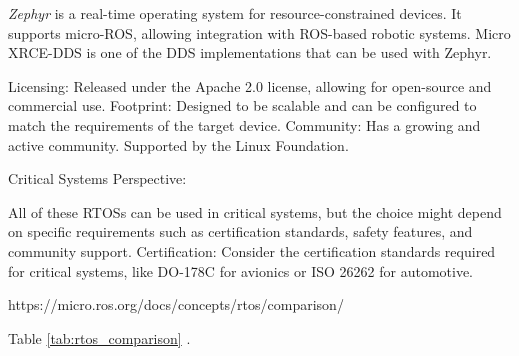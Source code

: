 \textit{Zephyr} is a real-time operating system for resource-constrained devices.
It supports micro-ROS, allowing integration with ROS-based robotic systems.
Micro XRCE-DDS is one of the DDS implementations that can be used with Zephyr.

Licensing: Released under the Apache 2.0 license, allowing for open-source and commercial use.
Footprint: Designed to be scalable and can be configured to match the requirements of the target device.
Community: Has a growing and active community. Supported by the Linux Foundation.

Critical Systems Perspective:

    All of these RTOSs can be used in critical systems, but the choice might depend on specific requirements such as certification standards, safety features, and community support.
    Certification: Consider the certification standards required for critical systems, like DO-178C for avionics or ISO 26262 for automotive.



https://micro.ros.org/docs/concepts/rtos/comparison/

Table \ref{tab:rtos_comparison} \cite{compRTOS}.
\begin{table}[H]
    \centering
    \caption{Comparison of Real-Time Operating Systems}
    \label{tab:rtos_comparison}
\end{table}


